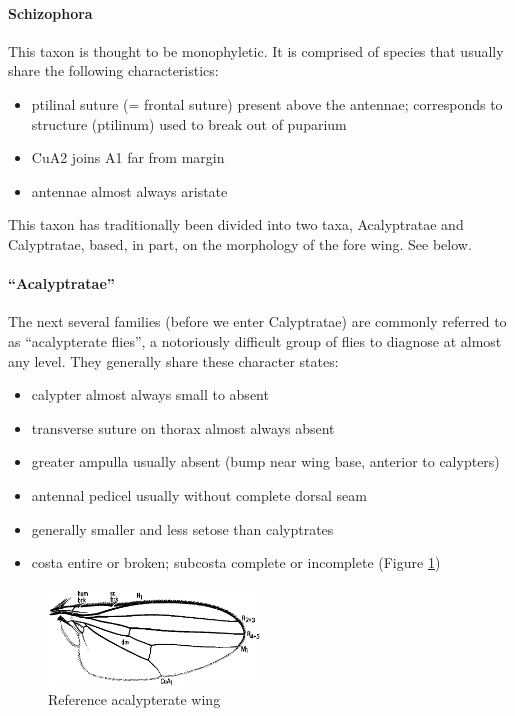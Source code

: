 \documentclass[letterpaper, 11pt]{article}
\begin{document}
\paragraph{Schizophora} This taxon is thought to be monophyletic. It is comprised of species that usually share the following characteristics: 
\begin{itemize}
\item ptilinal suture (= frontal suture) present above the antennae; corresponds to structure (ptilinum) used to break out of puparium
\item CuA2 joins A1 far from margin
\item antennae almost always aristate
\end{itemize}
This taxon has traditionally been divided into two taxa, Acalyptratae and Calyptratae, based, in part, on the morphology of the fore wing. See below.

\paragraph{``Acalyptratae''} The next several families (before we enter Calyptratae) are commonly referred to as ``acalypterate flies'', a notoriously difficult group of flies to diagnose at almost any level. They generally share these character states:
\begin{itemize}
\item calypter almost always small to absent
\item transverse suture on thorax almost always absent
\item greater ampulla usually absent (bump near wing base, anterior to calypters)
\item antennal pedicel usually without complete dorsal seam
\item generally smaller and less setose than calyptrates
\item costa entire or broken; subcosta complete or incomplete (Figure \ref{fig:acalypteratewing})
\end{itemize}

\begin{figure}[ht!]
  \centering
    \includegraphics[width=0.5\textwidth]{AcalyptrateWing}
  \caption{Reference acalypterate wing \citep[][Fig. 4.59]{mcalpine1981manual}}
  \label{fig:acalypteratewing}
\end{figure}
\end{document}
